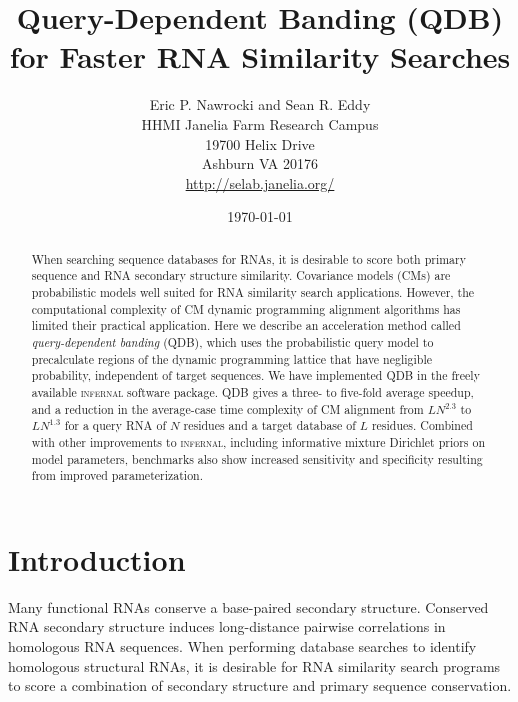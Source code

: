 \documentclass[11pt]{article}
\begin{document}
\title{Query-Dependent Banding (QDB) for Faster RNA Similarity Searches}
\author{Eric P. Nawrocki and Sean R. Eddy\\
HHMI Janelia Farm Research Campus\\
19700 Helix Drive\\
Ashburn VA 20176\\
\url{http://selab.janelia.org/}\\
}
\date{\today}
\maketitle




\begin{abstract}

When searching sequence databases for RNAs, it is desirable to score
both primary sequence and RNA secondary structure similarity.
Covariance models (CMs) are probabilistic models well suited for RNA
similarity search applications. However, the computational complexity
of CM dynamic programming alignment algorithms has limited their
practical application. Here we describe an acceleration method called
\emph{query-dependent banding} (QDB), which uses the probabilistic
query model to precalculate regions of the dynamic programming lattice
that have negligible probability, independent of target sequences. We
have implemented QDB in the freely available \textsc{infernal}
software package.  QDB gives a three- to five-fold average speedup,
and a reduction in the average-case time complexity of CM alignment
from $LN^{2.3}$ to $LN^{1.3}$ for a query RNA of $N$ residues and a
target database of $L$ residues. Combined with other improvements to
\textsc{infernal}, including informative mixture Dirichlet priors on
model parameters, benchmarks also show increased sensitivity and
specificity resulting from improved parameterization.

\end{abstract}



\section{Introduction}

Many functional RNAs conserve a base-paired secondary structure.
Conserved RNA secondary structure induces long-distance pairwise
correlations in homologous RNA sequences.  When performing database
searches to identify homologous structural RNAs, it is desirable for
RNA similarity search programs to score a combination of secondary
structure and primary sequence conservation.
\end{document}
